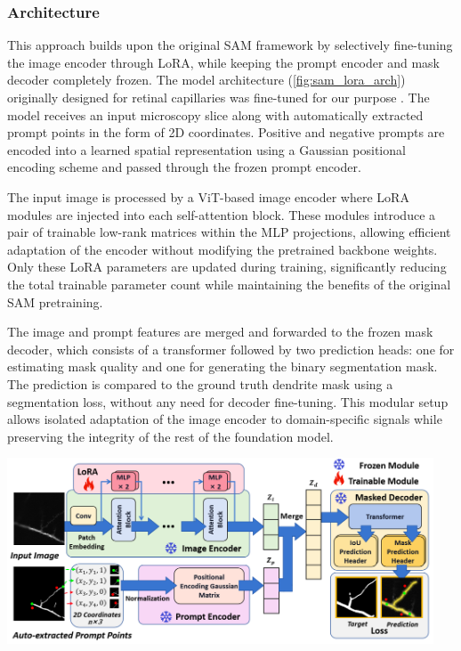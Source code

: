 \subsubsection{\textbf{Architecture}}
This approach builds upon the original \gls{SAM} framework by selectively fine-tuning the image encoder through \gls{LoRA}, while keeping the prompt encoder and mask decoder completely frozen. The model architecture (\autoref{fig:sam_lora_arch}) originally designed for retinal capillaries was fine-tuned for our purpose \cite{Wang_2023}. The model receives an input microscopy slice along with automatically extracted prompt points in the form of 2D coordinates. Positive and negative prompts are encoded into a learned spatial representation using a Gaussian positional encoding scheme and passed through the frozen prompt encoder.

The input image is processed by a \gls{ViT}-based image encoder where \gls{LoRA} modules are injected into each self-attention block. These modules introduce a pair of trainable low-rank matrices within the \gls{MLP} projections, allowing efficient adaptation of the encoder without modifying the pretrained backbone weights. Only these \gls{LoRA} parameters are updated during training, significantly reducing the total trainable parameter count while maintaining the benefits of the original \gls{SAM} pretraining.

The image and prompt features are merged and forwarded to the frozen mask decoder, which consists of a transformer followed by two prediction heads: one for estimating mask quality and one for generating the binary segmentation mask. The prediction is compared to the ground truth dendrite mask using a segmentation loss, without any need for decoder fine-tuning. This modular setup allows isolated adaptation of the image encoder to domain-specific signals while preserving the integrity of the rest of the foundation model.

\begin{center}
\includegraphics[width=0.95\textwidth]{figures/14_sam_lora_arch.jpg}
\label{fig:sam_lora_arch}
\end{center}

